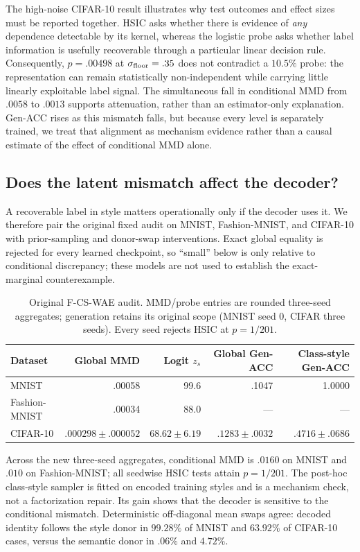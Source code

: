 \documentclass{article}
\begin{document}
The high-noise CIFAR-10 result illustrates why test outcomes and effect sizes
must be reported together.  HSIC asks whether there is evidence of \emph{any}
dependence detectable by its kernel, whereas the logistic probe asks whether
label information is usefully recoverable through a particular linear
decision rule.  Consequently, $p=.00498$ at $\sigma_{\rm floor}=.35$ does not
contradict a $10.5\%$ probe: the representation can remain statistically
non-independent while carrying little linearly exploitable label signal.
The simultaneous fall in conditional MMD from $.0058$ to $.0013$ supports
attenuation, rather than an estimator-only explanation.  Gen-ACC rises as
this mismatch falls, but because every level is separately trained, we treat
that alignment as mechanism evidence rather than a causal estimate of the
effect of conditional MMD alone.

\subsection{Does the latent mismatch affect the decoder?}

A recoverable label in style matters operationally only if the decoder uses
it.  We therefore pair the original fixed audit on MNIST, Fashion-MNIST, and
CIFAR-10 with prior-sampling and donor-swap interventions.  Exact global
equality is rejected for every learned checkpoint, so ``small'' below is only
relative to conditional discrepancy; these models are not used to establish
the exact-marginal counterexample.

\begin{table}[t]
\caption{Original F-CS-WAE audit.  MMD/probe entries are rounded three-seed
aggregates; generation retains its original scope (MNIST seed 0, CIFAR three
seeds).  Every seed rejects HSIC at $p=1/201$.}
\label{tab:image-audit}
\centering
\small
\begin{tabular}{lrrrr}
\toprule
Dataset & Global MMD & Logit $z_s$ & Global Gen-ACC & Class-style Gen-ACC \\
\midrule
MNIST & .00058 & 99.6 & .1047 & 1.0000 \\
Fashion-MNIST & .00034 & 88.0 & --- & --- \\
CIFAR-10 & $.000298\!\pm\!.000052$ & $68.62\!\pm\!6.19$ & $.1283\!\pm\!.0032$ & $.4716\!\pm\!.0686$ \\
\bottomrule
\end{tabular}
\end{table}

Across the new three-seed aggregates, conditional MMD is $.0160$ on MNIST and
$.010$ on Fashion-MNIST; all seedwise HSIC tests attain $p=1/201$.  The
post-hoc class-style sampler is fitted on encoded training styles and is
a mechanism check, not a factorization repair.  Its gain shows that the
decoder is sensitive to the conditional mismatch.  Deterministic off-diagonal
mean swaps agree: decoded identity follows the style donor in $99.28\%$ of
MNIST and $63.92\%$ of CIFAR-10 cases, versus the semantic donor in $.06\%$
and $4.72\%$.
\end{document}
